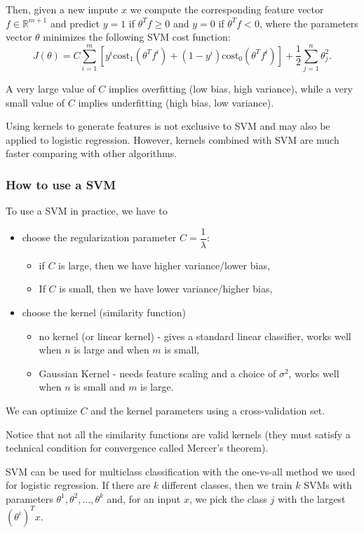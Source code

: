 \documentclass[a4paper,11pt]{report}
\begin{document}
Then, given a new impute $x$ we compute the corresponding feature vector $f\in\mathbb{R}^{m+1}$ and predict $y=1$ if $\theta^Tf \ge 0$  and $y=0$ if $\theta^Tf < 0$, where the parameters vector $\theta$ minimizes the following SVM cost function:
$$ J(\theta) = C\sum_{i=1}^m \left[y^{i}\text{cost}_1(\theta^Tf^{i}) + (1 - y^{i})\text{cost}_0(\theta^Tf^{i})\right] + \dfrac{1}{2}\sum_{j=1}^n \theta^2_j.$$

A very large value of $C$ implies overfitting (low bias, high variance), while a very small value of $C$ implies underfitting (high bias, low variance).

Using kernels to generate features is not exclusive to SVM and may also be applied to logistic regression. However, kernels combined with SVM are much faster comparing with other algorithms.


\subsubsection*{How to use a SVM}

To use a SVM in practice, we have to
\begin{itemize}
\item choose the regularization parameter $C=\dfrac{1}{\lambda}$:
\begin{itemize}
  \item if $C$ is large, then we have higher variance/lower bias,
  \item If $C$ is small, then we have lower variance/higher bias,
\end{itemize}
\item choose the kernel (similarity function)
\begin{itemize}
\item no kernel (or linear kernel) - gives a standard linear classifier, works well when $n$ is large and when $m$ is small,
\item Gaussian Kernel - needs feature scaling and a choice of $\sigma^2$, works well when $n$ is small and $m$ is large.
\end{itemize}
\end{itemize}

We can optimize $C$ and the kernel parameters using a cross-validation set.

Notice that not all the similarity functions are valid kernels (they must satisfy a technical condition for convergence called Mercer's theorem).

SVM can be used for multiclass classification with the one-vs-all method we used for logistic regression. If there are $k$ different classes, then we train $k$ SVMs with parameters $\theta^1, \theta^2, \ldots, \theta^k$ and, for an input $x$, we pick the class $j$ with the largest $(\theta^i)^Tx$.
\end{document}
